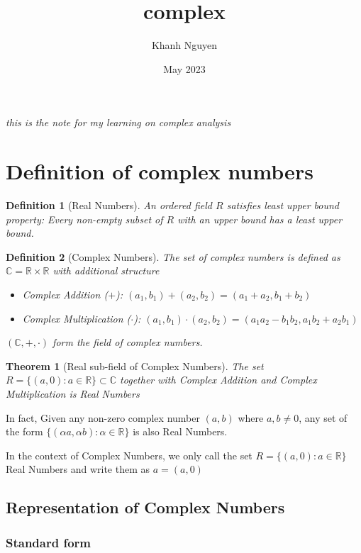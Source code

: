 \documentclass{article}
\title{complex}
\author{Khanh Nguyen}
\date{May 2023}
\newtheorem{theorem}{Theorem}
\newtheorem{definition}{Definition}
\begin{document}
\maketitle

\emph{this is the note for my learning on complex analysis}

\section{Definition of complex numbers}

\begin{definition}[Real Numbers]
    An ordered field $R$ satisfies least upper bound property: Every non-empty subset of $R$ with an upper bound has a least upper bound.
\end{definition}

\begin{definition}[Complex Numbers]
    The set of complex numbers is defined as $\mathbb{C} = \mathbb{R} \times \mathbb{R}$ with additional structure
    \begin{itemize}
        \item Complex Addition ($+$): $(a_1, b_1) + (a_2, b_2) = (a_1 + a_2, b_1 + b_2)$
        \item Complex Multiplication ($\cdot$): $(a_1, b_1) \cdot (a_2, b_2) = (a_1 a_2 - b_1 b_2, a_1 b_2 + a_2 b_1)$
    \end{itemize}
    $(\mathbb{C}, +, \cdot)$ form the field of complex numbers.
\end{definition}

\begin{theorem}[Real sub-field of Complex Numbers]
    The set $R = \{(a, 0): a \in \mathbb{R}\} \subset \mathbb{C}$ together with Complex Addition and Complex Multiplication is Real Numbers
\end{theorem}

In fact, Given any non-zero complex number $(a, b)$ where $a, b \neq 0$, any set of the form $\{(\alpha a, \alpha b): \alpha \in \mathbb{R}\}$ is also Real Numbers.

In the context of Complex Numbers, we only call the set $R = \{(a, 0): a \in \mathbb{R}\}$ Real Numbers and write them as $a = (a, 0)$

\subsection{Representation of Complex Numbers}

\subsubsection{Standard form}
\end{document}
